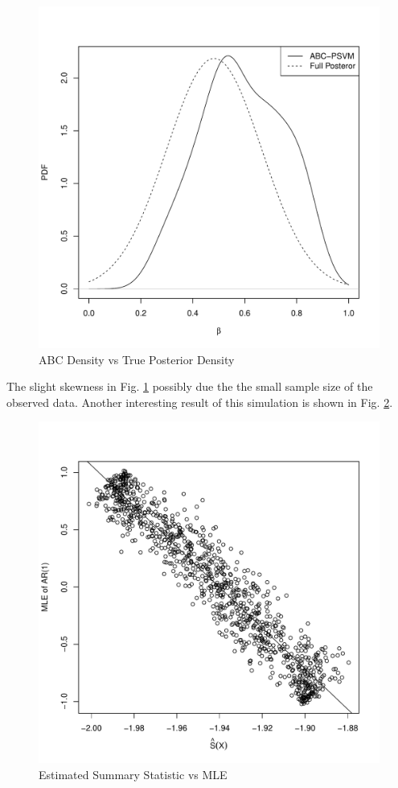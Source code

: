 \begin{example}
\begin{figure}
\includegraphics[scale=0.7]{ABCvsFull_100_1000_4.pdf}\protect\caption{ABC Density vs True Posterior Density\label{fig:ABC-vs-True}}
\end{figure}
The slight skewness in Fig. \ref{fig:ABC-vs-True} possibly due the
the small sample size of the observed data. Another interesting result
of this simulation is shown in Fig. \ref{fig:ss-vs-mle}. 
\begin{figure}
\includegraphics[scale=0.7]{ESSvsMLE_100_1000_4.pdf}\protect\caption{Estimated Summary Statistic vs MLE\label{fig:ss-vs-mle}}

\end{figure}
\end{example}
